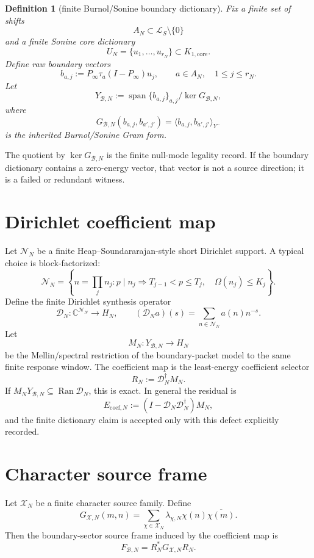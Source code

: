 \documentclass[11pt]{article}
\newtheorem{definition}{Definition}
\newcommand{\cB}{\mathcal B}
\newcommand{\cN}{\mathcal N}
\newcommand{\cD}{\mathcal D}
\newcommand{\cX}{\mathcal X}
\newcommand{\Ran}{\operatorname{Ran}}
\newcommand{\Span}{\operatorname{span}}
\begin{document}
\begin{definition}[finite Burnol/Sonine boundary dictionary]
Fix a finite set of shifts
\[
        A_N\subset \mathcal L_S\setminus\{0\}
\]
and a finite Sonine core dictionary
\[
        U_N=\{u_1,\ldots,u_{r_N}\}\subset K_{1,\mathrm{core}}.
\]
Define raw boundary vectors
\[
        b_{a,j}:=P_\infty\tau_a(I-P_\infty)u_j,
        \qquad a\in A_N,\quad 1\le j\le r_N.
\]
Let
\[
        Y_{\cB,N}:=\Span\{b_{a,j}\}_{a,j}/\ker G_{\cB,N},
\]
where
\[
        G_{\cB,N}(b_{a,j},b_{a',j'})
        =
        \langle b_{a,j},b_{a',j'}\rangle_{Y^-}
\]
is the inherited Burnol/Sonine Gram form.
\end{definition}

The quotient by \(\ker G_{\cB,N}\) is the finite null-mode legality record. If the boundary dictionary contains a zero-energy vector, that vector is not a source direction; it is a failed or redundant witness.

\section{Dirichlet coefficient map}

Let \(\cN_N\) be a finite Heap--Soundararajan-style short Dirichlet support. A typical choice is block-factorized:
\[
        \cN_N=
        \left\{
        n=\prod_j n_j:
        p\mid n_j\Rightarrow T_{j-1}<p\le T_j,\quad
        \Omega(n_j)\le K_j
        \right\}.
\]
Define the finite Dirichlet synthesis operator
\[
        \cD_N:\mathbb C^{\cN_N}\to H_N,\qquad
        (\cD_N a)(s)=\sum_{n\in\cN_N}a(n)n^{-s}.
\]
Let
\[
        M_N:Y_{\cB,N}\to H_N
\]
be the Mellin/spectral restriction of the boundary-packet model to the same finite response window. The coefficient map is the least-energy coefficient selector
\[
        \boxed{
        R_N:=\cD_N^\dagger M_N.
        }
\]
If \(M_NY_{\cB,N}\subseteq \Ran\cD_N\), this is exact. In general the residual is
\[
        E_{\mathrm{coef},N}
        :=
        (I-\cD_N\cD_N^\dagger)M_N,
\]
and the finite dictionary claim is accepted only with this defect explicitly recorded.

\section{Character source frame}

Let \(\cX_N\) be a finite character source family. Define
\[
        G_{\cX,N}(m,n)
        =
        \sum_{\chi\in\cX_N}
        \lambda_{\chi,N}\chi(n)\overline{\chi(m)}.
\]
Then the boundary-sector source frame induced by the coefficient map is
\[
        \boxed{
        F_{\cB,N}
        =
        R_N^*G_{\cX,N}R_N.
        }
\]
\end{document}
